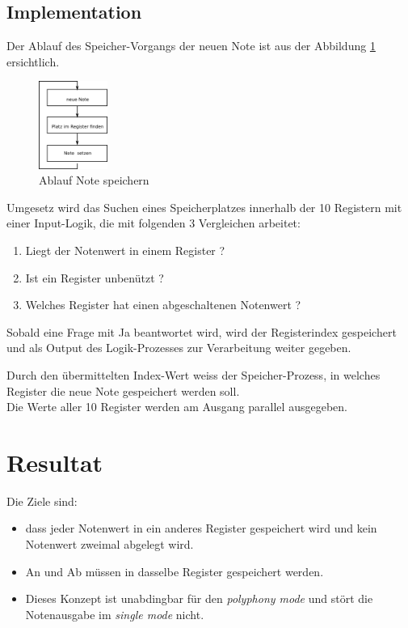 \subsection{Implementation}

Der Ablauf des Speicher-Vorgangs der neuen Note ist aus der Abbildung \ref{fig.polyphnie_ablauf} ersichtlich.

\begin{figure}[H]
	\includegraphics[width=0.2\textwidth]{images/midi_interface/polyphnie_ablauf.png}
	\caption{Ablauf Note speichern }
	\label{fig.polyphnie_ablauf}
\end{figure}

Umgesetz wird das Suchen eines Speicherplatzes innerhalb der 10 Registern mit einer Input-Logik, die mit folgenden 3 Vergleichen arbeitet:

\begin{enumerate}
	\item Liegt der Notenwert in einem Register ? 
	\item Ist ein Register unbenützt ?
	\item Welches Register hat einen abgeschaltenen Notenwert ?
\end{enumerate}

Sobald eine Frage mit Ja beantwortet wird, wird der Registerindex gespeichert und als Output des Logik-Prozesses zur Verarbeitung weiter gegeben.

Durch den übermittelten Index-Wert weiss der Speicher-Prozess, in welches Register die neue Note gespeichert werden soll.\\
Die Werte aller 10 Register werden am Ausgang parallel ausgegeben.

\section{Resultat}\label{test_polypohne}

Die Ziele sind:

\begin{itemize}
    \item dass jeder Notenwert in ein anderes Register gespeichert wird und kein Notenwert zweimal abgelegt wird.
    \item An und Ab müssen in dasselbe Register gespeichert werden.
    \item Dieses Konzept ist unabdingbar für den \textit{polyphony mode} und stört die Notenausgabe im \textit{single mode} nicht. 
\end{itemize}


